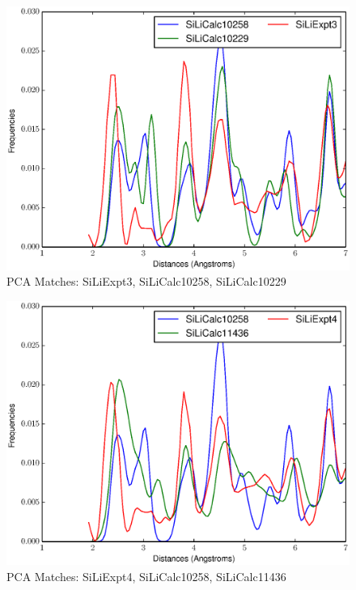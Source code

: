 \documentclass[12pt,letterpaper]{article}
\begin{document}
\begin{figure}[ht]
\begin{center}
\includegraphics[scale=0.8]{figs/PC128MatchSiLiExpt3-SiLiCalc10258-SiLiCalc10229.eps}
\caption{PCA Matches: SiLiExpt3, SiLiCalc10258, SiLiCalc10229}
\end{center}
\end{figure}

\begin{figure}[ht]
\begin{center}
\includegraphics[scale=0.8]{figs/PC128MatchSiLiExpt4-SiLiCalc10258-SiLiCalc11436.eps}
\caption{PCA Matches: SiLiExpt4, SiLiCalc10258, SiLiCalc11436}
\end{center}
\end{figure}
\end{document}
